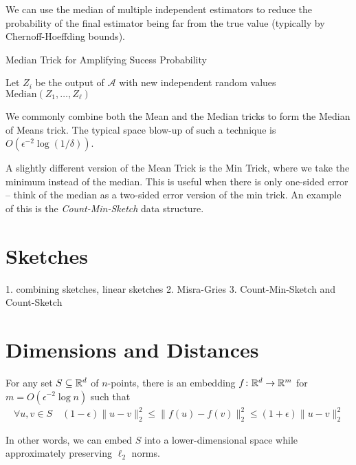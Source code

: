 \documentclass{article}
\begin{document}
We can use the median of multiple independent estimators to reduce the probability of the final estimator being far from the true value (typically by Chernoff-Hoeffding bounds).

\begin{algorithm}
  \caption{Median Trick for Amplifying Sucess Probability}
  \begin{algorithmic}[1]
    \State Let $Z_i$ be the output of $\mathcal{A}$ with new independent random values
    \EndFor
    \State \Return $\text{Median}(Z_1, \ldots, Z_\ell)$
    \EndProcedure
  \end{algorithmic}
\end{algorithm}

We commonly combine both the Mean and the Median tricks to form the Median of Means trick.
The typical space blow-up of such a technique is $O(\epsilon^{-2} \log (1 / \delta))$.

A slightly different version of the Mean Trick is the Min Trick, where we take the minimum instead of the median.
This is useful when there is only one-sided error -- think of the median as a two-sided error version of the min trick.
An example of this is the \emph{Count-Min-Sketch} data structure.

\section{Sketches}

1. combining sketches, linear sketches
2. Misra-Gries
3. Count-Min-Sketch and Count-Sketch

\section{Dimensions and Distances}

\begin{lemma}
For any set $S \subseteq \mathbb{R}^d$ of $n$-points, there is an embedding $f \colon \mathbb{R}^d \to \mathbb{R}^m$ for $m = O(\epsilon^{-2} \log n)$ such that
\begin{align}
  \forall u, v \in S \quad (1 - \epsilon) \|u - v\|_2^2 \le \|f(u) - f(v)\|_2^2 \le (1 + \epsilon) \|u - v\|_2^2
\end{align}
\end{lemma}
In other words, we can embed $S$ into a lower-dimensional space while approximately preserving $\ell_2$ norms.
\end{document}
